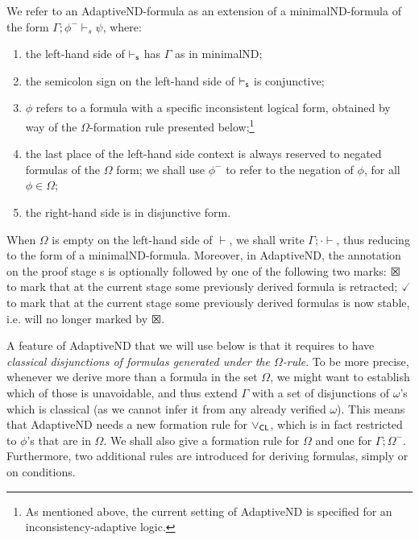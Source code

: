 \documentclass[]{article}
\begin{document}
We refer to an {\sf AdaptiveND}-formula as an extension of a {\sf minimalND}-formula of the form $\Gamma; \phi^{-}\vdash_{s} \psi$, where: 

\begin{enumerate}
\item the left-hand side of $\vdash_{\sf s}$ has $\Gamma$ as in {\sf minimalND};
\item the semicolon sign on the left-hand side of $\vdash_{\sf s}$ is conjunctive;
\item $\phi$ refers to a formula with a specific inconsistent logical form, obtained by way of the $\Omega$-formation rule presented below;\footnote{As mentioned above, the current setting of {\sf AdaptiveND} is specified for an inconsistency-adaptive logic.}
\item the last place of the left-hand side context is always reserved to negated formulas of the $\Omega$ form; we shall use $\phi^{-}$ to refer to the negation of $\phi$, for all $\phi\in \Omega$;
\item the right-hand side is in disjunctive form.
\end{enumerate}
%
When $\Omega$ is empty on the left-hand side of $\vdash$, we shall write $\Gamma;\cdot\vdash$, thus reducing to the form of a {\sf minimalND}-formula. 
Moreover, in {\sf AdaptiveND}, the annotation on the proof stage {\sf s} is optionally followed by one of the following two marks: $\XBox$ to mark that at the current stage some previously derived formula is retracted; $\checked$ to mark that at the current stage some previously derived formulas is now stable, i.e. will no longer marked by $\XBox$. 

A feature of {\sf AdaptiveND} that we will use below is that it requires to have \textit{classical disjunctions of formulas generated under the $\Omega$-rule}. To be more precise, whenever we derive more than a formula in the set $\Omega$, we might want to establish which of those is unavoidable, and thus extend $\Gamma$ with a set of disjunctions of $\omega$'s which is classical (as we cannot infer it from any already verified $\omega$). This means that {\sf AdaptiveND} needs a new formation rule for $\vee_{\sf CL}$, which is in fact restricted to $\phi$'s that are in $\Omega$. We shall also give a formation rule for $\Omega$ and one for $\Gamma; \Omega^{-}$. Furthermore, two additional rules are introduced for deriving formulas, simply or on conditions. 
\end{document}
